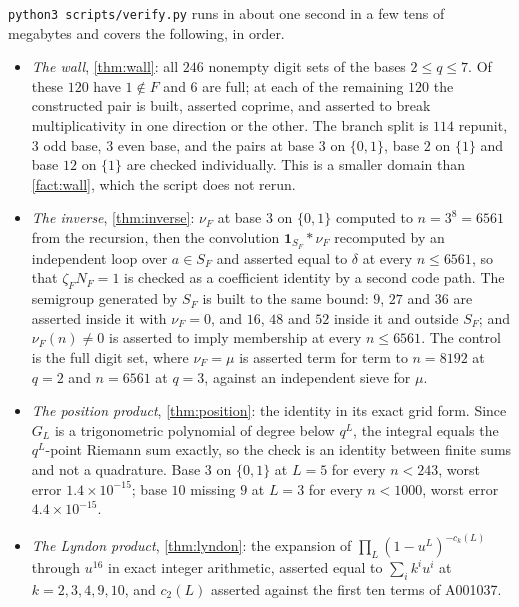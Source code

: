 \documentclass[11pt]{amsart}
\theoremstyle{definition}
\theoremstyle{remark}
\begin{document}
\texttt{python3 scripts/verify.py} runs in about one second in a few tens of megabytes and covers the following, in order.
\begin{itemize}
\item \emph{The wall}, \cref{thm:wall}: all $246$ nonempty digit sets of the bases $2 \le q \le 7$. Of these $120$ have $1 \notin F$ and $6$ are full; at each of the remaining $120$ the constructed pair is built, asserted coprime, and asserted to break multiplicativity in one direction or the other. The branch split is $114$ repunit, $3$ odd base, $3$ even base, and the pairs at base $3$ on $\{0,1\}$, base $2$ on $\{1\}$ and base $12$ on $\{1\}$ are checked individually. This is a smaller domain than \cref{fact:wall}, which the script does not rerun.
\item \emph{The inverse}, \cref{thm:inverse}: $\nu_{F}$ at base $3$ on $\{0,1\}$ computed to $n = 3^{8} = 6561$ from the recursion, then the convolution $\mathbf{1}_{S_{F}} * \nu_{F}$ recomputed by an independent loop over $a \in S_{F}$ and asserted equal to $\delta$ at every $n \le 6561$, so that $\zeta_{F}N_{F} = 1$ is checked as a coefficient identity by a second code path. The semigroup generated by $S_{F}$ is built to the same bound: $9$, $27$ and $36$ are asserted inside it with $\nu_{F} = 0$, and $16$, $48$ and $52$ inside it and outside $S_{F}$; and $\nu_{F}(n) \ne 0$ is asserted to imply membership at every $n \le 6561$. The control is the full digit set, where $\nu_{F} = \mu$ is asserted term for term to $n = 8192$ at $q = 2$ and $n = 6561$ at $q = 3$, against an independent sieve for $\mu$.
\item \emph{The position product}, \cref{thm:position}: the identity in its exact grid form. Since $G_{L}$ is a trigonometric polynomial of degree below $q^{L}$, the integral equals the $q^{L}$-point Riemann sum exactly, so the check is an identity between finite sums and not a quadrature. Base $3$ on $\{0,1\}$ at $L = 5$ for every $n < 243$, worst error $1.4 \times 10^{-15}$; base $10$ missing $9$ at $L = 3$ for every $n < 1000$, worst error $4.4 \times 10^{-15}$.
\item \emph{The Lyndon product}, \cref{thm:lyndon}: the expansion of $\prod_{L}(1-u^{L})^{-c_{k}(L)}$ through $u^{16}$ in exact integer arithmetic, asserted equal to $\sum_{i}k^{i}u^{i}$ at $k = 2, 3, 4, 9, 10$, and $c_{2}(L)$ asserted against the first ten terms of A001037.

\end{itemize}
\end{document}
